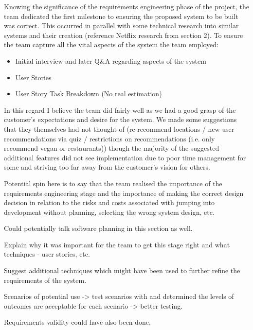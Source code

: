 \documentclass{l3proj}
\begin{document}
Knowing the significance of the requirements engineering phase of the project, the team dedicated the first milestone to ensuring the proposed system to be built was correct. This occurred in parallel with some technical research into similar systems and their creation (reference Netflix research from section 2). To ensure the team capture all the vital aspects of the system the team employed:

\begin{itemize}
\item Initial interview and later Q&A regarding aspects of the system
\item User Stories
\item User Story Task Breakdown (No real estimation)
\end{itemize}

In this regard I believe the team did fairly well as we had a good grasp of the customer's expectations and desire for the system. We made some suggestions that they themselves had not thought of (re-recommend locations / new user recommendations via quiz / restrictions on recommendations (i.e. only recommend vegan or restaurants)) though the majority of the suggested additional features did not see implementation due to poor time management for some and striving too far away from the customer's vision for others.

Potential spin here is to say that the team realised the importance of the requirements engineering stage and the importance of making the correct design decision in relation to the risks and costs associated with jumping into development without planning, selecting the wrong system design, etc.

Could potentially talk software planning in this section as well.

Explain why it was important for the team to get this stage right and what techniques - user stories, etc.

Suggest additional techniques which might have been used to further refine the requirements of the system.

Scenarios of potential use -> test scenarios with and determined the levels of outcomes are acceptable for each scenario -> better testing.

Requirements validity could have also been done. 
\end{document}
